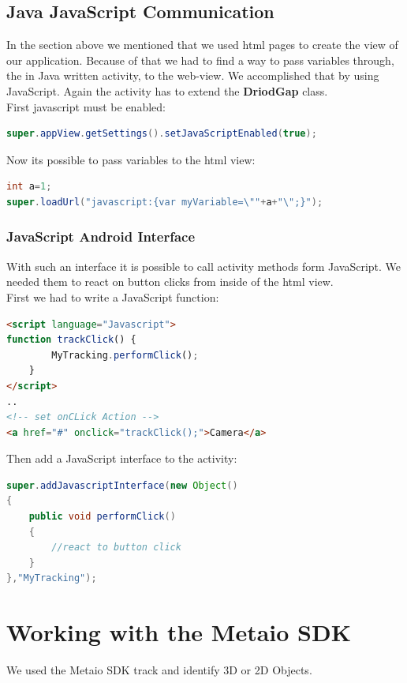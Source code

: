 \subsection{Java JavaScript Communication}
In the section above we mentioned that we used html pages to create the view of our application. Because of that we had to find a way to pass variables through, the in Java written activity, to the web-view. We accomplished that by using JavaScript. Again the activity has to extend the \textbf{DriodGap} class.
\\



First javascript must be enabled:
\begin{lstlisting}[language=java,captionpos=b, caption=Java-JavaScript communication]
super.appView.getSettings().setJavaScriptEnabled(true);
\end{lstlisting}

Now its possible to pass variables to the html view:
\begin{lstlisting}[language=java]
int a=1;
super.loadUrl("javascript:{var myVariable=\""+a+"\";}");
\end{lstlisting}


\subsubsection{JavaScript Android Interface}
With such an interface it is possible to call activity methods form JavaScript. We needed them to react on button clicks from inside of the html view.  
\\

First we had to write a JavaScript function:
\begin{lstlisting}[language=html, captionpos=b]
<script language="Javascript">
function trackClick() {
        MyTracking.performClick();
    }
</script>
..
<!-- set onCLick Action -->
<a href="#" onclick="trackClick();">Camera</a>
\end{lstlisting}





Then add a JavaScript interface to the activity:
\begin{lstlisting}[language=java, caption=JavaScript Android Interface, captionpos=b]
super.addJavascriptInterface(new Object()
{
	public void performClick()
	{
		//react to button click
	}
},"MyTracking");
\end{lstlisting}

\section{Working with the Metaio SDK}
We used the Metaio SDK track and identify 3D or 2D Objects.


